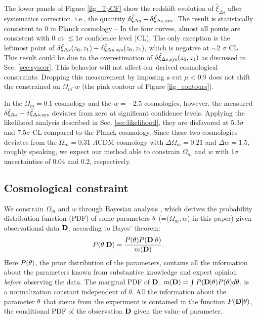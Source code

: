 \documentclass[iop]{emulateapj}
\begin{document}
The lower panels of Figure \ref{fig_TpCF} show the redshift evolution of $\hat\xi_{\Delta s}$ after systematics correction, 
i.e., the quantity $\delta\hat \xi_{\Delta s}-\delta\hat \xi_{\Delta s,\rm sys}$.
The result is statistically consistent to 0 in Planck cosmology -- 
In the four curves, almost all points are consistent with 0 at $\lesssim1\sigma$ confidence level (CL).
The only exception is the leftmost point of $\delta\hat \xi_{\Delta s}(z_6,z_1)-\delta\hat \xi_{\Delta s,\rm sys}(z_6,z_1)$,
 which is negative at $\sim$2 $\sigma$ CL.
This result could be due to the overestimation of $\delta\hat\xi_{\Delta s, \rm sys}(z_6,z_1)$ as discussed in Sec. \ref{sec:syscor}.
This behavior will not affect our derived cosmological constraints:
Dropping this measurement by imposing a cut $\mu<0.9$
  does not shift the constrained on $\Omega_m$-$w$ (the pink contour of Figure \ref{fig_contours}).

In the $\Omega_m=0.1$ cosmology and the $w=-2.5$ cosmologies, however,
the measured $\delta\hat \xi_{\Delta s}-\delta\hat \xi_{\Delta s,\rm sys}$ deviates 
from zero at significant confidence levels.
Applying the likelihood analysis described in Sec. \ref{sec:likelihood},
 they are disfavored at 5.3$\sigma$ and 7.5$\sigma$ CL compared to the Planck cosmology.
Since these two cosmologies deviates from the $\Omega_m=0.31$ $\Lambda$CDM cosmology with $\Delta \Omega_m = 0.21$ and $\Delta w = 1.5$,
roughly speaking, we expect our method able to constrain $\Omega_m$ and $w$ with 1$\sigma$ uncertainties of 0.04 and 0.2, respectively.




\subsection{Cosmological constraint}\label{sec:constraint}




We constrain $\Omega_m$ and $w$ through Bayesian analysis \citep{Bayesian},
which derives the probability distribution function (PDF) of some parameters $\bf \theta$ (=($\Omega_m,w$) in this paper)
given observational data $\bf D$, 
according to Bayes' theorem:
\begin{equation}
 P({\bf \theta}|{\bf D}) = \frac{P({\bf \theta})P({\bf D}|{\bf \theta})}{m({\bf D})}.
\end{equation}
Here $P(\bf \theta)$, the prior distribution of the parameters,
contains all the information about the parameters known from substantive knowledge 
and expert opinion {\it before} observing the data.
The marginal PDF of $\bf D$, 
$m({\bf D})=\int P({\bf D|\theta})P({\bf \theta})d{\bf \theta}$, 
is a normalization constant independent of $\theta$.
All the information about the parameter $\bf \theta$ that stems from the experiment
is contained in the function $P({\bf D}|{\bf \theta})$, 
the conditional PDF of the observation $\bf D$ given the value of parameter.
\end{document}
